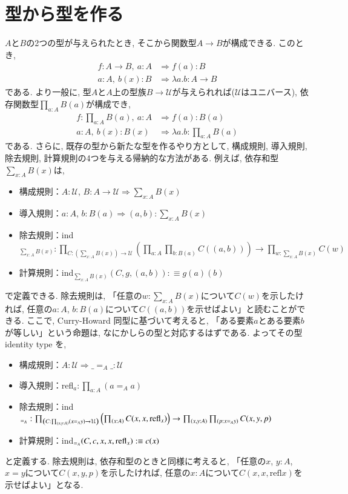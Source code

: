 \documentclass[11pt]{jsreport}
\theoremstyle{mystyle}
\newcommand{\Lra}{\Longrightarrow}
\newcommand{\U}{\mathcal{U}}
\newcommand{\refl}{\textrm{refl}}
\newcommand{\0}{\textbf{0}}
\newcommand{\1}{\textbf{1}}
\newcommand{\2}{\textbf{2}}
\begin{document}
\section{型から型を作る} \label{sec inductive}
$A$と$B$の2つの型が与えられたとき, そこから関数型$A \to B$が構成できる. このとき, 
\begin{align*}
  f : A \to B,\ a : A &\Lra f(a) : B \\
  a : A,\ b(x) : B &\Lra \lambda a. b : A \to B 
\end{align*}
である. より一般に, 型$A$と$A$上の型族$B \to \U$が与えられれば($\U$はユニバース), 依存関数型$\prod_{a : A} B(a)$が構成でき, 
\begin{align*}
  f :\prod_{a : A} B(a),\ a : A &\Lra f(a) : B(a) \\
  a : A,\ b(x) : B(x) &\Lra \lambda a. b : \prod_{a : A} B(a) 
\end{align*}
である. さらに, 既存の型から新たな型を作るやり方として, 構成規則, 導入規則, 除去規則, 計算規則の4つを与える帰納的な方法がある. 例えば, 依存和型$\sum_{x : A} B(x)$は, 
\begin{itemize}
  \item 構成規則：$A : \U$, $B : A \to \U \Lra \sum_{x : A} B(x)$
  \item 導入規則：$a : A$, $b : B(a) \Lra (a, b) : \sum_{x : A} B(x)$
  \item 除去規則：ind$_{\sum_{x : A} B(x)} : \prod_{C : (\sum_{x : A} B(x)) \to \U} 
                               \left(\prod_{a : A} \prod_{b : B(a)} C((a, b)) \right) \to 
                                      \prod_{w : \sum_{x : A} B(x)} C(w)$
  \item 計算規則：ind$_{\sum_{x : A} B(x)} (C, g, (a, b)) :\equiv g(a)(b)$
\end{itemize}
で定義できる. 除去規則は, 「任意の$w : \sum_{x : A} B(x)$について$C(w)$を示したければ, 任意の$a : A$, $b : B(a)$について$C((a, b))$を示せばよい」と読むことができる. 
ここで, Curry-Howard 同型に基づいて考えると, 「ある要素$a$とある要素$b$が等しい」という命題は, なにかしらの型と対応するはずである. よってその型 identity type を, 
\begin{itemize}
  \item 構成規則：$A : \U \Lra \_ =_A \_ : \U$
  \item 導入規則：refl$_a : \prod_{a : A} (a =_A a)$
  \item 除去規則：ind$_{=_A} : \prod_{\left( C : \prod_{(x, y : A)} (x =_A y) \to \U \right)} 
                                       \left( \prod_{(x : A)} C(x, x, {\rm refl}_x) \right) \to
                                       \prod_{(x, y : A)} \prod_{(p : x =_A y)} C(x, y, p)$
  \item 計算規則：ind$_{=_A} (C, c, x, x, {\rm refl}_x) : \equiv c(x)$
\end{itemize}
と定義する. 除去規則は, 依存和型のときと同様に考えると, 「任意の$x$, $y : A$, $x = y$について$C(x, y, p)$を示したければ, 任意の$x : A$について$C(x, x, \refl{x})$を示せばよい」となる. 
\end{document}
